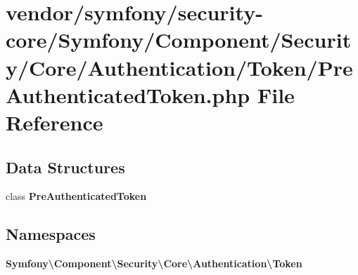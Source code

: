 \section{vendor/symfony/security-\/core/\+Symfony/\+Component/\+Security/\+Core/\+Authentication/\+Token/\+Pre\+Authenticated\+Token.php File Reference}
\label{_pre_authenticated_token_8php}
\subsection*{Data Structures}
\begin{DoxyCompactItemize}
\item 
class {\bf Pre\+Authenticated\+Token}
\end{DoxyCompactItemize}
\subsection*{Namespaces}
\begin{DoxyCompactItemize}
\item 
 {\bf Symfony\textbackslash{}\+Component\textbackslash{}\+Security\textbackslash{}\+Core\textbackslash{}\+Authentication\textbackslash{}\+Token}
\end{DoxyCompactItemize}
